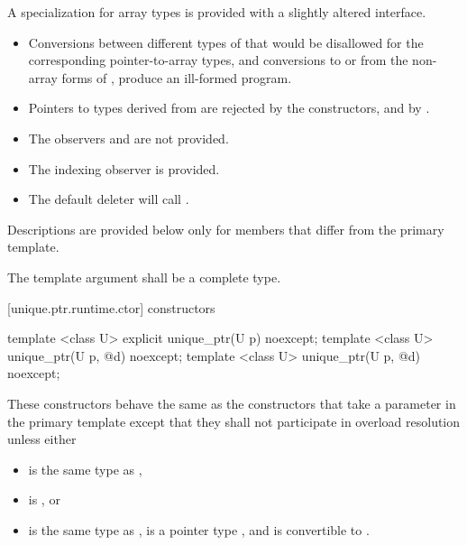 \pnum
A specialization for array types is provided with a slightly altered
interface.

\begin{itemize}
\item Conversions between different types of
that would be disallowed for the corresponding pointer-to-array types,
and conversions to or from the non-array forms of
, produce an ill-formed program.

\item Pointers to types derived from  are
rejected by the constructors, and by .

\item The observers  and
 are not provided.

\item The indexing observer  is provided.

\item The default deleter will call .
\end{itemize}

\pnum
Descriptions are provided below only for members that
differ from the primary template.

\pnum
The template argument  shall be a complete type.

[unique.ptr.runtime.ctor]{ constructors}

%
\begin{itemdecl}
template <class U> explicit unique_ptr(U p) noexcept;
template <class U> unique_ptr(U p, @\seebelow@ d) noexcept;
template <class U> unique_ptr(U p, @\seebelow@ d) noexcept;
\end{itemdecl}

\begin{itemdescr}
\pnum
These constructors behave the same as
the constructors that take a  parameter
in the primary template
except that they
shall not participate in overload resolution unless either

\begin{itemize}
\item {} is the same type as ,
\item {} is , or
\item {} is the same type as ,
       is a pointer type , and
       is convertible to .
\end{itemize}
\end{itemdescr}

